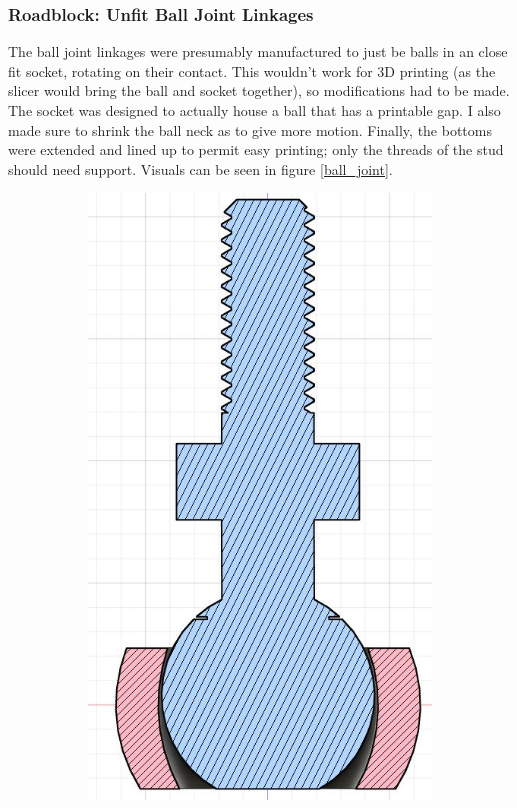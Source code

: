 \documentclass[a4paper, 10pt]{article}
\begin{document}
		\subsubsection{Roadblock: Unfit Ball Joint Linkages}
		The ball joint linkages were presumably manufactured to just be balls in an close fit socket, rotating on their contact. This wouldn't work for 3D printing (as the slicer would bring the ball and socket together), so modifications had to be made. The socket was designed to actually house a ball that has a printable gap. I also made sure to shrink the ball neck as to give more motion. Finally, the bottoms were extended and lined up to permit easy printing; only the threads of the stud should need support. Visuals can be seen in figure \ref{ball_joint}.
		
		\begin{figure}[h]
			\centering
			\begin{subfigure}[h]{0.34\textwidth}
				\centering
				\includegraphics[width=\textwidth]{section_ball_joint}

\end{subfigure}
\end{figure}
\end{document}
